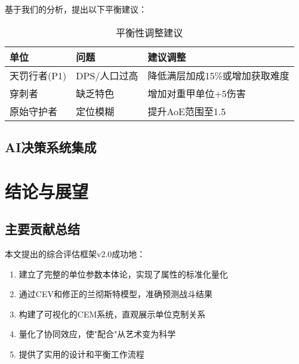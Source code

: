 \documentclass[a4paper,12pt]{article}
\begin{document}
基于我们的分析，提出以下平衡建议：

\begin{table}[h]
\centering
\caption{平衡性调整建议}
\begin{tabular}{lll}
\toprule
\textbf{单位} & \textbf{问题} & \textbf{建议调整} \\
\midrule
天罚行者(P1) & DPS/人口过高 & 降低满层加成15\%或增加获取难度 \\
穿刺者 & 缺乏特色 & 增加对重甲单位+5伤害 \\
原始守护者 & 定位模糊 & 提升AoE范围至1.5 \\
\bottomrule
\end{tabular}
\end{table}

\subsection{AI决策系统集成}

\begin{center}
\end{center}

\section{结论与展望}

\subsection{主要贡献总结}
本文提出的综合评估框架v2.0成功地：
\begin{enumerate}
\item 建立了完整的单位参数本体论，实现了属性的标准化量化
\item 通过CEV和修正的兰彻斯特模型，准确预测战斗结果
\item 构建了可视化的CEM系统，直观展示单位克制关系
\item 量化了协同效应，使"配合"从艺术变为科学
\item 提供了实用的设计和平衡工作流程
\end{enumerate}
\end{document}
